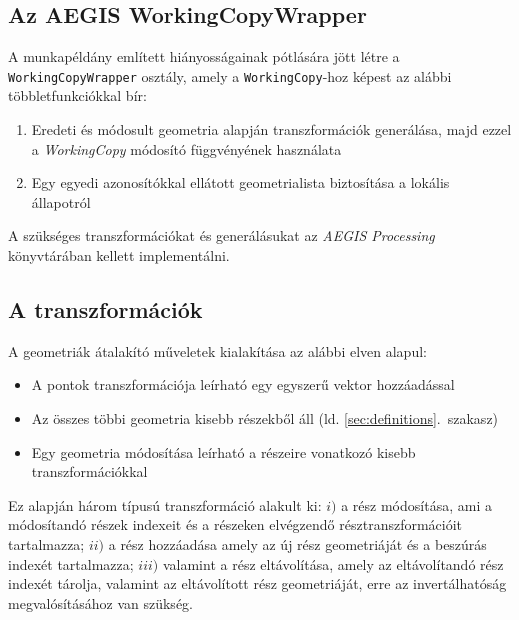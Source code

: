 \subsection{Az AEGIS WorkingCopyWrapper}
A munkapéldány említett hiányosságainak pótlására jött létre a \texttt{WorkingCopyWrapper} osztály, amely a \texttt{WorkingCopy}-hoz képest az alábbi többletfunkciókkal bír:
\begin{enumerate}
	\item Eredeti és módosult geometria alapján transzformációk generálása, majd ezzel a \emph{WorkingCopy} módosító függvényének használata
	\item Egy egyedi azonosítókkal ellátott geometrialista biztosítása a lokális állapotról
\end{enumerate}
A szükséges transzformációkat és generálásukat az \emph{AEGIS Processing} könyvtárában kellett implementálni.
\subsection{A transzformációk}
A geometriák átalakító műveletek kialakítása az alábbi elven alapul:
\begin{itemize}
	\item A pontok transzformációja leírható egy egyszerű vektor hozzáadással
	\item Az összes többi geometria kisebb részekből áll (ld. \ref{sec:definitions}.~szakasz)
	\item Egy geometria módosítása leírható a részeire vonatkozó kisebb transzformációkkal
\end{itemize}
Ez alapján három típusú transzformáció alakult ki: $i)$ a rész módosítása, ami a módosítandó részek indexeit és a részeken elvégzendő résztranszformációit tartalmazza; $ii)$ a rész hozzáadása amely az új rész geometriáját és a beszúrás indexét tartalmazza; $iii)$ valamint a rész eltávolítása, amely az eltávolítandó rész indexét tárolja, valamint az eltávolított rész geometriáját, erre az invertálhatóság megvalósításához van szükség.
